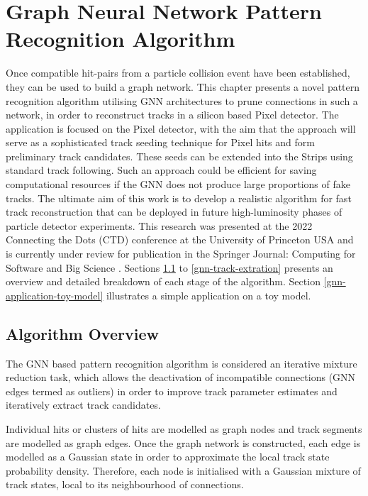 
\chapter{Graph Neural Network Pattern Recognition Algorithm}\label{chapter-5}

Once compatible hit-pairs from a particle collision event have been established, they can be used to build a graph network. This chapter presents a novel pattern recognition algorithm utilising GNN architectures to prune connections in such a network, in order to reconstruct tracks in a silicon based Pixel detector. The application is focused on the Pixel detector, with the aim that the approach will serve as a sophisticated track seeding technique for Pixel hits and form preliminary track candidates. These seeds can be extended into the Strips using standard track following. Such an approach could be efficient for saving computational resources if the GNN does not produce large proportions of fake tracks. The ultimate aim of this work is to develop a realistic algorithm for fast track reconstruction that can be deployed in future high-luminosity phases of particle detector experiments. This research was presented at the 2022 Connecting the Dots (CTD) conference at the University of Princeton USA and is currently under review for publication in the Springer Journal: Computing for Software and Big Science \cite{Lad_2023_gnn}. Sections \ref{gnn-algorithm-overview} to \ref{gnn-track-extration} presents an overview and detailed breakdown of each stage of the algorithm. Section \ref{gnn-application-toy-model} illustrates a simple application on a toy model.



\section{Algorithm Overview}
\label{gnn-algorithm-overview}
The GNN based pattern recognition algorithm is considered an iterative mixture reduction task, which allows the deactivation of incompatible connections (GNN edges termed as outliers) in order to improve track parameter estimates and iteratively extract track candidates. 

Individual hits or clusters of hits are modelled as graph nodes and track segments are modelled as graph edges. Once the graph network is constructed, each edge is modelled as a Gaussian state in order to approximate the local track state probability density. Therefore, each node is initialised with a Gaussian mixture of track states, local to its neighbourhood of connections.

